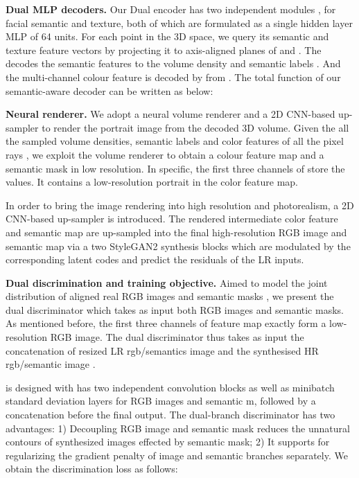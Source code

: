 \documentclass[acmtog]{acmart}
\begin{document}
\noindent \textbf{Dual MLP decoders.} 
Our Dual encoder  has two independent modules , for facial semantic and texture, both of which are formulated as a single hidden layer MLP of 64 units.
For each point  in the 3D space, we query its semantic and texture feature vectors  by projecting it to axis-aligned planes of  and . The  decodes the semantic features  to the volume density  and semantic labels . And the multi-channel colour feature  is decoded  by  from . The total function of our semantic-aware decoder  can be written as below:




\noindent \textbf{Neural renderer.} We adopt a neural volume renderer and a 2D CNN-based up-sampler to render the portrait image from the decoded 3D volume. Given the all the sampled volume densities, semantic labels and color features of all the pixel rays , we exploit the volume renderer to obtain a colour feature map  and a semantic mask  in low resolution. In specific, the first three channels of  store the  values. It contains a low-resolution portrait in the color feature map.





In order to bring the image rendering into high resolution and photorealism, a 2D CNN-based up-sampler is introduced. The rendered intermediate color feature  and semantic map  are up-sampled into the final high-resolution RGB image  and semantic map  via a two StyleGAN2 synthesis blocks which are modulated by the corresponding latent codes and predict the residuals of the LR inputs.

\noindent \textbf{Dual discrimination and training objective.} Aimed to model the joint distribution of aligned real RGB images and semantic masks , we present the dual discriminator  which takes as input both RGB images and semantic masks. As mentioned before, the first three channels of feature map  exactly form a low-resolution RGB image.  The dual discriminator thus takes as input the concatenation of resized LR rgb/semantics image and the synthesised HR rgb/semantic image .


 is designed with has two independent convolution blocks as well as minibatch standard deviation layers for RGB images  and semantic m, followed by a concatenation before the final output. The dual-branch discriminator has two advantages: 1) Decoupling RGB image and semantic mask reduces the unnatural contours of synthesized images effected by semantic mask; 2) It supports for regularizing the gradient penalty of image and semantic branches separately. We obtain the discrimination loss as follows: 
\end{document}
